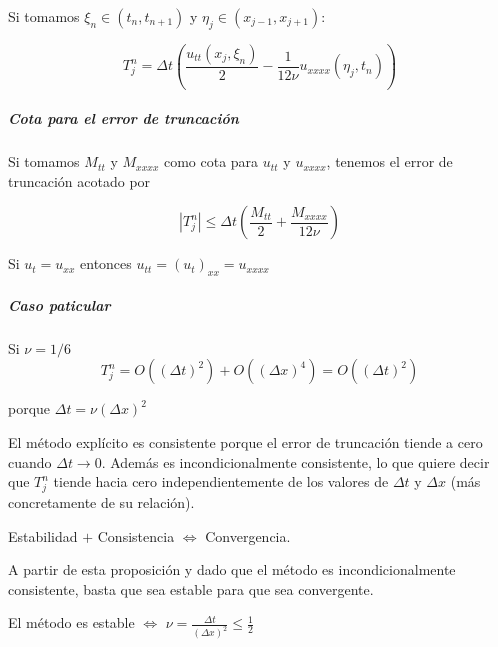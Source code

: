 Si tomamos $\xi_n \in (t_n,t_{n+1})$ y $\eta_j \in (x_{j-1}, x_{j+1}):$

$$T_j^n = \Delta t \left(\frac{u_{tt}(x_j,\xi_n)}{2}- \frac{1}{12\nu} u_{xxxx}(\eta_j,t_n)\right)$$

\subparagraph*{Cota para el error de truncación}

Si tomamos $M_{tt}$ y $M_{xxxx}$ como cota para $u_{tt}$ y $u_{xxxx}$, tenemos el error de truncación acotado por

$$|T_j^n| \le \Delta t \left(\frac{M_{tt}}{2} + \frac{M_{xxxx}}{12{\nu}}\right)$$

Si $u_{t} = u_{xx}$ entonces $u_{tt} = (u_{t})_{xx} = u_{xxxx}$

\subparagraph*{Caso paticular}
\mbox{}

Si $\nu = 1/6$
$$T_j^n = O\left((\Delta t)^2\right) + O\left((\Delta x)^4\right) = O\left((\Delta t)^2\right)$$ 

porque 
$\Delta t = \nu (\Delta x )^2$

El método explícito es consistente porque el error de truncación tiende a cero cuando $\Delta t \to 0$.
Además es incondicionalmente consistente, lo que quiere decir que $T_j^n$ tiende hacia cero independientemente de los valores de $\Delta t$ y $\Delta x$ (más concretamente de su relación).

\begin{prop}
	Estabilidad  $+$ Consistencia $\iff$ Convergencia.
\end{prop} 

A partir de esta proposición y dado que el método es incondicionalmente consistente, basta que sea estable para que sea convergente.

\begin{prop}
El método es estable $\iff$ $\nu = \frac{\Delta t}{\left(\Delta x\right)^2} \le \frac{1}{2}$
\end{prop}


